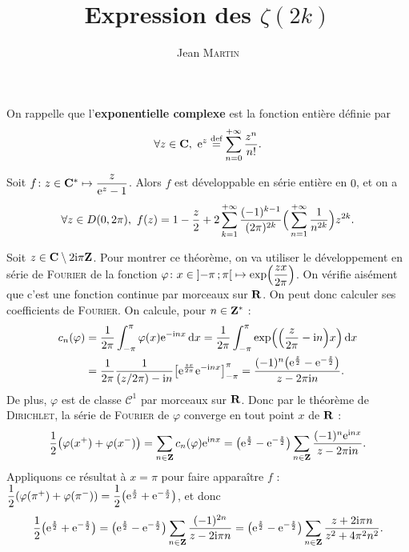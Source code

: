 \documentclass[ikea]{../ceri/sty/MasterArticle}
\title{Expression des $\zeta(2k)$}
\author{Jean \textsc{Martin}}
\date{}
\begin{document}
\maketitle

On rappelle que l'\textbf{exponentielle complexe} est la fonction entière définie par
\[ \forall z\in\mathbf{C},\ \mathrm{e}^z\overset{\text{def}}=\sum_{n=0}^{+\infty}\frac{z^n}{n!}. \]

\begin{theo*}
    Soit $f\colon z\in\mathbf{C}^*\mapsto\dfrac{z}{\mathrm{e}^z-1}$. Alors $f$ est développable en série entière en $0$, et on a
    \[ \forall z\in D(0,2\pi),\ f(z) = 1 - \frac z2 + 2\sum_{k=1}^{+\infty}\frac{(-1)^{k-1}}{(2\pi)^{2k}}\Big(\sum_{n=1}^{+\infty}\frac 1{n^{2k}}\Big)z^{2k}\text. \]
\end{theo*}

\begin{demo}
    Soit $z\in\mathbf{C}\setminus 2\mathrm{i}\pi\mathbf{Z}$. Pour montrer ce théorème, on va utiliser le développement en série de \textsc{Fourier} de la fonction $\varphi\colon x\in\intoo{-\pi}\pi\mapsto\exp\left( \dfrac{zx}{2\pi} \right)$. On vérifie aisément que c'est une fonction continue par morceaux sur $\mathbf{R}$. On peut donc calculer ses coefficients de \textsc{Fourier}. On calcule, pour $n\in\mathbf{Z}^*$ :
    \begin{align*}
        c_n(\varphi) & = \frac 1{2\pi}\int_{-\pi}^\pi\varphi(x)\e^{-\i nx}\d x = \frac 1{2\pi}\int_{-\pi}^{\pi}\exp\left( \left( \frac z{2\pi}-\i n \right)x \right)\d x                           \\
                     & = \frac 1{2\pi}\frac 1{(z/2\pi)-\i n}\left[ \e^{\frac{zx}{2\pi}}\e^{-\i nx} \right]_{-\pi}^\pi = \frac{(-1)^n\left( \e^{\frac z2}-\e^{-\frac z2} \right)}{z-2\pi\i n}\text.
    \end{align*}
    De plus, $\varphi$ est de classe $\mathscr C^1$ par morceaux sur $\mathbf{R}$. Donc par le théorème de \textsc{Dirichlet}, la série de \textsc{Fourier} de $\varphi$ converge en tout point $x$ de $\mathbf{R}$ :
    \[ \frac 12\left( \varphi(x^+)+\varphi(x^-) \right) = \sum_{n\in\Z}c_n(\varphi)\e^{\i nx} = \left( \e^{\frac z2}-\e^{-\frac z2} \right)\sum_{n\in\Z}\frac{(-1)^n\e^{\i nx}}{z-2\pi\i n}\text. \]
    Appliquons ce résultat à $x=\pi$ pour faire apparaître $f$ : $\dfrac 12\left( \varphi(\pi^+)+\varphi(\pi^-) \right) = \dfrac 12\left( \e^{\frac z2}+\e^{-\frac z2} \right)$, et donc
    \[ \frac 12\left( \e^{\frac z2}+\e^{-\frac z2} \right) = \left( \e^{\frac z2}-\e^{-\frac z2} \right)\sum_{n\in\Z}\frac{(-1)^{2n}}{z-2\i\pi n} = \left( \e^{\frac z2}-\e^{-\frac z2} \right)\sum_{n\in\Z}\frac{z+2\i\pi n}{z^2+4\pi^2n^2}\text. \]

\end{demo}
\end{document}
